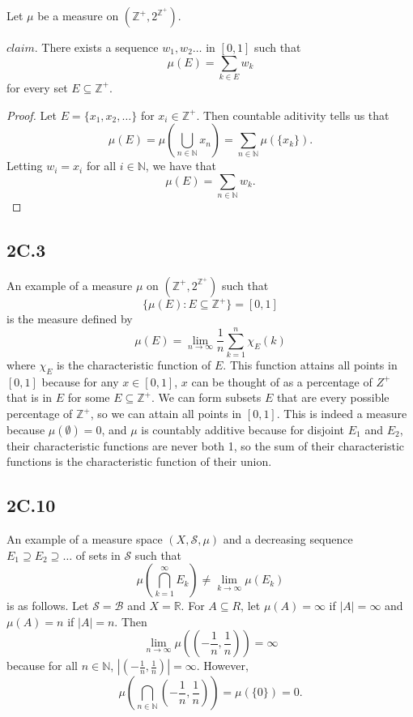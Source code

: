 \documentclass[12pt]{article}
\begin{document}
Let $\mu$ be a measure on $(\mathbb{Z}^+, 2^{\mathbb{Z^+}})$.

$claim.$ There exists a sequence $w_1, w_2 \ldots$ in $[0,1]$ such that $$\mu(E) = \sum_{k \in E} w_k$$ for every set $E \subseteq \mathbb{Z}^+$.

\begin{proof}
    Let $E = \{x_1, x_2, \ldots\}$ for $x_i \in \mathbb{Z}^+$. Then countable aditivity tells us that $$\mu(E) = \mu \left(\bigcup_{n \in \mathbb{N}} {x_n} \right) = \sum_{n \in \mathbb{N}} \mu(\{x_k\}).$$ Letting $w_i = x_i$ for all $i \in \mathbb{N}$, we have that $$\mu(E) = \sum_{n \in \mathbb{N}} w_k.$$
\end{proof}

\subsection*{2C.3}

An example of a measure $\mu$ on $(\mathbb{Z}^+, 2^{\mathbb{Z^+}})$ such that $$\{ \mu(E) : E \subseteq \mathbb{Z}^+ \} = [0,1]$$ is the measure defined by $$\mu(E) = \lim_{n \to \infty} \frac{1}{n} \sum_{k=1}^{n} \chi_E(k)$$ where $\chi_E$ is the characteristic function of $E$. This function attains all points in $[0,1]$ because for any $x \in [0,1]$, $x$ can be thought of as a percentage of $Z^+$ that is in $E$ for some $E \subseteq \mathbb{Z}^+$. We can form subsets $E$ that are every possible percentage of $\mathbb{Z}^+$, so we can attain all points in $[0,1]$. This is indeed a measure because $\mu(\emptyset) = 0$, and $\mu$ is countably additive because for disjoint $E_1$ and $E_2$, their characteristic functions are never both 1, so the sum of their characteristic functions is the characteristic function of their union.

\subsection*{2C.10}

An example of a measure space $(X, \mathcal{S}, \mu)$ and a decreasing sequence $E_1 \supseteq E_2 \supseteq \ldots$ of sets in $\mathcal{S}$ such that $$\mu \left(\bigcap_{k=1}^\infty E_k\right) \neq \lim_{k \to \infty} \mu(E_k)$$ is as follows. Let $\mathcal{S} = \mathcal{B}$ and $X = \mathbb{R}$. For $A \subseteq R$, let $\mu(A) = \infty$ if $|A| = \infty$ and $\mu(A) = n$ if $|A| = n$. Then $$\lim_{n \to \infty} \mu((-\frac{1}{n}, \frac{1}{n})) = \infty$$ because for all $n \in \mathbb{N}$, $|(-\frac{1}{n}, \frac{1}{n})| = \infty$. However, $$\mu \left( \bigcap_{n \in \mathbb{N}} (-\frac{1}{n}, \frac{1}{n})\right) = \mu(\{0\}) = 0.$$
\end{document}
